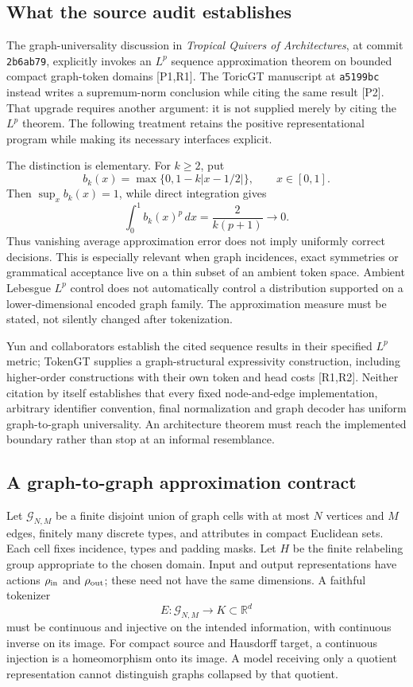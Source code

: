 \subsection{What the source audit establishes}

The graph-universality discussion in \emph{Tropical Quivers of Architectures}, at commit \texttt{2b6ab79}, explicitly invokes an $L^p$ sequence approximation theorem on bounded compact graph-token domains [P1,R1]. The ToricGT manuscript at \texttt{a5199bc} instead writes a supremum-norm conclusion while citing the same result [P2]. That upgrade requires another argument: it is not supplied merely by citing the $L^p$ theorem. The following treatment retains the positive representational program while making its necessary interfaces explicit.

The distinction is elementary. For $k\ge2$, put
\[
 b_k(x)=\max\{0,1-k|x-1/2|\},\qquad x\in[0,1].
\]
Then $\sup_x b_k(x)=1$, while direct integration gives
\[
 \int_0^1 b_k(x)^p\,dx=\frac{2}{k(p+1)}\longrightarrow0.
\]
Thus vanishing average approximation error does not imply uniformly correct decisions. This is especially relevant when graph incidences, exact symmetries or grammatical acceptance live on a thin subset of an ambient token space. Ambient Lebesgue $L^p$ control does not automatically control a distribution supported on a lower-dimensional encoded graph family. The approximation measure must be stated, not silently changed after tokenization.

Yun and collaborators establish the cited sequence results in their specified $L^p$ metric; TokenGT supplies a graph-structural expressivity construction, including higher-order constructions with their own token and head costs [R1,R2]. Neither citation by itself establishes that every fixed node-and-edge implementation, arbitrary identifier convention, final normalization and graph decoder has uniform graph-to-graph universality. An architecture theorem must reach the implemented boundary rather than stop at an informal resemblance.

\subsection{A graph-to-graph approximation contract}

Let $\mathcal G_{N,M}$ be a finite disjoint union of graph cells with at most $N$ vertices and $M$ edges, finitely many discrete types, and attributes in compact Euclidean sets. Each cell fixes incidence, types and padding masks. Let $H$ be the finite relabeling group appropriate to the chosen domain. Input and output representations have actions $\rho_{\rm in}$ and $\rho_{\rm out}$; these need not have the same dimensions. A faithful tokenizer
\[
 E:\mathcal G_{N,M}\longrightarrow K\subset\mathbb R^d
\]
must be continuous and injective on the intended information, with continuous inverse on its image. For compact source and Hausdorff target, a continuous injection is a homeomorphism onto its image. A model receiving only a quotient representation cannot distinguish graphs collapsed by that quotient.

